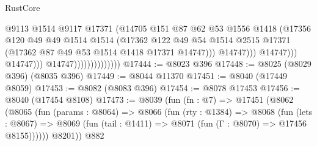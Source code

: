 \begin{lexlean}{RustCore}
\begin{coremodule}
                                                @9113
                                                @1514
                                                @9117
                                                @17371
                                                (@14705
                                                  @151
                                                  @87
                                                  @62
                                                  @53
                                                  @1556
                                                  @1418
                                                  (@17356
                                                    @120
                                                    @49
                                                    @49
                                                    @1514
                                                    @1514
                                                    (@17362
                                                      @122
                                                      @49
                                                      @54
                                                      @1514
                                                      @2515
                                                      @17371
                                                      (@17362
                                                        @87
                                                        @49
                                                        @53
                                                        @1514
                                                        @1418
                                                        @17371
                                                        @14747)))
                                                  @14747)))
                                            @14747)))
                                      @14747)))
                                @14747))))))))))))))
@17444 := @8023 @396
@17448 := @8025 (@8029 @396) (@8035 @396)
@17449 := @8044 @11370
@17451 := @8040 (@17449 @8059)
@17453 := @8082 (@8083 @396)
@17454 := @8078 @17453
@17456 := @8040 (@17454 @8108)
@17473 := @8039
    (fun (fn : @7) =>
    @17451
      (@8062
        (@8065
          (fun (params : @8064) =>
          @8066
            (fun (rty : @1384) =>
            @8068
              (fun (lets : @8067) =>
              @8069 (fun (tail : @1411) => @8071 (fun (Γ : @8070) => @17456 @8155))))))
        @8201))
    @882

\end{coremodule}
\end{lexlean}
